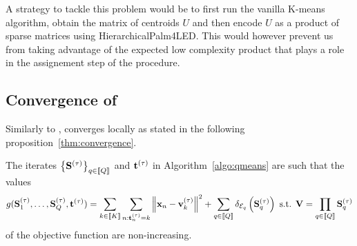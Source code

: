 


\begin{remark}
A strategy to tackle this problem would be to first run the vanilla K-means algorithm,
 obtain the matrix of centroids $U$ and then encode $U$ as a product of sparse matrices
 using HierarchicalPalm4LED. This would however prevent us from taking advantage of 
 the expected low complexity product that plays a role in the assignement step of 
 the procedure.
\end{remark}


\subsection{Convergence of \qkmeans}
Similarly to \kmeans, \qkmeans converges locally as stated in the following proposition~\ref{thm:convergence}.

\begin{proposition}
\label{thm:convergence}
The iterates $\left \lbrace{\mathbf{S}}^{(\tau)} \right \rbrace_{q\in\left \llbracket Q\right \rrbracket}$ and ${\mathbf{t}}^{(\tau)}$ in Algorithm~\ref{algo:qmeans} are such that the values
\begin{align}
\label{eq:qmean_problem_2}
    g({\mathbf{S}}_1^{(\tau)}, \ldots,{\mathbf{S}}_Q^{(\tau)}, {\mathbf{t}}^{(\tau)})
    = \sum_{k\in\left \llbracket K\right \rrbracket} \sum_{n: {\mathbf{t}}^{(\tau)}_n = k} \left \| {\mathbf{x}}_n - {\mathbf{v}}^{(\tau)}_k\right \|^2 + \sum_{q\in\left \llbracket Q\right \rrbracket} \delta_{\mathcal{E}_q}\left ({\mathbf{S}}_q^{(\tau)}\right )
    \text{ s.t. } {\mathbf{V}} = \prod_{q\in\left \llbracket Q\right \rrbracket}{{\mathbf{S}}_q^{(\tau)}}
\end{align}
of the objective function are non-increasing.
\end{proposition}





